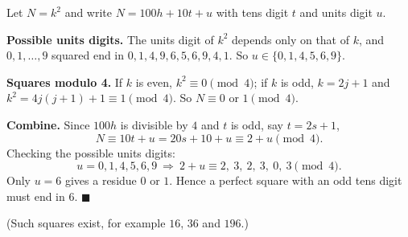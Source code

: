 Let $N=k^2$ and write $N=100h+10t+u$ with tens digit $t$ and units digit $u$.

\textbf{Possible units digits.} The units digit of $k^2$ depends only on that of $k$, and $0,1,\dots,9$ squared end in $0,1,4,9,6,5,6,9,4,1$. So $u\in\{0,1,4,5,6,9\}$.

\textbf{Squares modulo 4.} If $k$ is even, $k^2\equiv0\pmod4$; if $k$ is odd, $k=2j+1$ and $k^2=4j(j+1)+1\equiv1\pmod 4$. So $N\equiv0$ or $1\pmod 4$.

\textbf{Combine.} Since $100h$ is divisible by $4$ and $t$ is odd, say $t=2s+1$,
\[N\equiv 10t+u=20s+10+u\equiv 2+u\pmod 4.\]
Checking the possible units digits:
\[u=0,1,4,5,6,9\ \Longrightarrow\ 2+u\equiv 2,\ 3,\ 2,\ 3,\ 0,\ 3\pmod4.\]
Only $u=6$ gives a residue $0$ or $1$. Hence a perfect square with an odd tens digit must end in $6$. $\blacksquare$

(Such squares exist, for example $16$, $36$ and $196$.)
